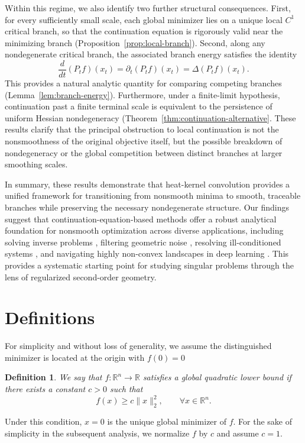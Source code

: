 \documentclass{article}
\newtheorem{definition}[definition]{Definition}
\begin{document}
Within this regime, we also identify two further structural consequences. First, for every sufficiently small scale, each global minimizer lies on a unique local $C^1$ critical branch, so that the continuation equation is rigorously valid near the minimizing branch (Proposition~\ref{prop:local-branch}). Second, along any nondegenerate critical branch, the associated branch energy satisfies the identity
$$
\frac{d}{dt}(P_t f)(x_t)=\partial_t(P_t f)(x_t)=\Delta(P_t f)(x_t).
$$
This provides a natural analytic quantity for comparing competing branches (Lemma~\ref{lem:branch-energy}). Furthermore, under a finite-limit hypothesis, continuation past a finite terminal scale is equivalent to the persistence of uniform Hessian nondegeneracy (Theorem~\ref{thm:continuation-alternative}. These results clarify that the principal obstruction to local continuation is not the nonsmoothness of the original objective itself, but the possible breakdown of nondegeneracy or the global competition between distinct branches at larger smoothing scales.

In summary, these results demonstrate that heat-kernel convolution provides a unified framework for transitioning from nonsmooth minima to smooth, traceable branches while preserving the necessary nondegenerate structure. Our findings suggest that continuation-equation-based methods offer a robust analytical foundation for nonsmooth optimization across diverse applications, including solving inverse problems \cite{yang2014mollification}, filtering geometric noise \cite{seo2010heat, lindeberg2013scale, chung2019heat}, resolving ill-conditioned systems \cite{luo2024regularization}, and navigating highly non-convex landscapes in deep learning \cite{xu2025global, gu2026deep}. This provides a systematic starting point for studying singular problems through the lens of regularized second-order geometry.

\section{Definitions} 
For simplicity and without loss of generality, we assume the distinguished minimizer is located at the origin with $f(0) = 0$
\begin{definition}\label{ass:global-lower-barrier} We say that $f:\mathbb R^n\to\mathbb R$ satisfies a global quadratic lower bound if there exists a constant $c>0$ such that
\begin{equation}\label{eq:quadratic_growth}
    f(x)\ge c\|x\|_2^2, \qquad\forall x\in\mathbb R^n.
\end{equation}
\end{definition}
Under this condition, $x=0$ is the unique global minimizer of $f$. For the sake of simplicity in the subsequent analysis, we normalize $f$ by $c$ and assume $c=1$.
\end{document}
